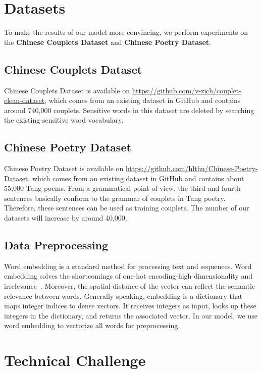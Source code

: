 \documentclass[11pt]{article}
\begin{document}
\section{Datasets}

To make the results of our model more convincing, we perform experiments on the \textbf{Chinese Couplets Dataset} and \textbf{Chinese Poetry Dataset}.

\subsection{Chinese Couplets Dataset}

Chinese Couplets Dataset is available on \url{https://github.com/v-zich/couplet-clean-dataset}, which comes from an existing dataset in GitHub and contains around 740,000 couplets. Sensitive words in this dataset are deleted by searching the existing sensitive word vocabulary.

\subsection{Chinese Poetry Dataset}

Chinese Poetry Dataset is available on \url{https://github.com/hlthu/Chinese-Poetry-Dataset}, which comes from an existing dataset in GitHub and contains about 55,000 Tang poems. From a grammatical point of view, the third and fourth sentences basically conform to the grammar of couplets in Tang poetry. Therefore, these sentences can be used as training couplets. The number of our datasets will increase by around 40,000.

\subsection{Data Preprocessing}

Word embedding is a standard method for processing text and sequences. Word embedding solves the shortcomings of one-hot encoding-high dimensionality and irrelevance~\cite{Mikolov:13}. Moreover, the spatial distance of the vector can reflect the semantic relevance between words. Generally speaking, embedding is a dictionary that maps integer indices to dense vectors. It receives integers as input, looks up these integers in the dictionary, and returns the associated vector. In our model, we use word embedding to vectorize all words for preprocessing.


\section{Technical Challenge}
\end{document}
